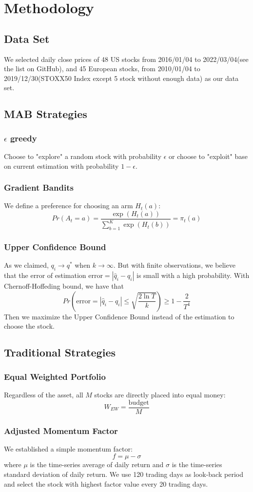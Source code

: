 \documentclass{article}
\begin{document}
\section{Methodology}
\subsection{Data Set}
We selected daily close prices of 48 US stocks from 2016/01/04 to 2022/03/04(see the list on GitHub), and 45 European stocks, from 2010/01/04 to 2019/12/30(STOXX50 Index except 5 stock without enough data) as our data set. 
\subsection{MAB Strategies}
\subsubsection{$\epsilon$ greedy}
Choose to "explore" a random stock with probability $\epsilon$ or choose to "exploit" base on current estimation with probability $1-\epsilon$.
\subsubsection{Gradient Bandits}
We define a preference for choosing an arm $H_t(a)$:
$$Pr(A_t=a)=\frac{\exp(H_t(a))}{\sum\limits_{b=1}^{K}\exp(H_t(b))}=\pi_t(a)$$
\subsubsection{Upper Confidence Bound}
As we claimed,  $q_i \to q^*$ when $k \to \infty$. But with finite observations, we believe that the error of estimation $\text{error}=|\hat q_i-q_i|$ is small with a high probability.
With Chernoff-Hoffeding bound, we have that
$$
Pr(\text{error}=|\hat q_i-q_i|\leq \sqrt{\frac{2\ln T}{k}})\geq	1-\frac{2}{T^4}
$$
Then we maximize the Upper Confidence Bound instead of the estimation to choose the stock.
\subsection{Traditional Strategies}
\subsubsection{Equal Weighted Portfolio}
Regardless of the asset, all $M$ stocks are directly placed into equal money: 
$$W_{EW} = \frac{\text{budget}}{M}$$
\subsubsection{Adjusted Momentum Factor}
We established a simple momentum factor:
$$f = \mu- \sigma$$
where $\mu$ is the time-series average of daily return and $\sigma$ is the time-series standard deviation of daily return. We use 120 trading days as look-back period and select the stock with highest factor value every 20 trading days.
\end{document}
